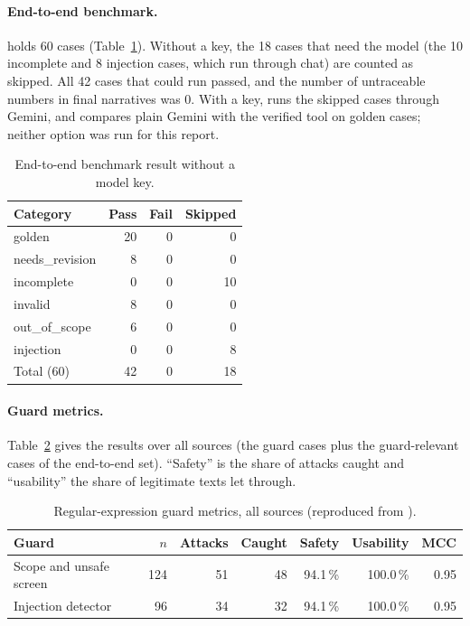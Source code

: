 \paragraph{End-to-end benchmark.}  holds 60 cases (Table~\ref{tab:bench}). Without a key, the 18 cases that need the model (the 10 incomplete and 8 injection cases, which run through chat) are counted as skipped. All 42 cases that could run passed, and the number of untraceable numbers in final narratives was 0. With a key,  runs the skipped cases through Gemini, and  compares plain Gemini with the verified tool on golden cases; neither option was run for this report.

\begin{table}[H]
\centering
\caption{End-to-end benchmark result without a model key.}\label{tab:bench}
\begin{tabular}{@{}lrrr@{}}
\toprule Category & Pass & Fail & Skipped \\ \midrule
golden & 20 & 0 & 0 \\
needs\_revision & 8 & 0 & 0 \\
incomplete & 0 & 0 & 10 \\
invalid & 8 & 0 & 0 \\
out\_of\_scope & 6 & 0 & 0 \\
injection & 0 & 0 & 8 \\
\midrule
Total (60) & 42 & 0 & 18 \\
\bottomrule
\end{tabular}
\end{table}

\paragraph{Guard metrics.} Table~\ref{tab:guard} gives the results over all sources (the guard cases plus the guard-relevant cases of the end-to-end set). ``Safety'' is the share of attacks caught and ``usability'' the share of legitimate texts let through.

\begin{table}[H]
\centering
\caption{Regular-expression guard metrics, all sources (reproduced from ).}\label{tab:guard}
\begin{tabular}{@{}lrrrrrr@{}}
\toprule Guard & $n$ & Attacks & Caught & Safety & Usability & MCC \\ \midrule
Scope and unsafe screen & 124 & 51 & 48 & 94.1\,\% & 100.0\,\% & 0.95 \\
Injection detector & 96 & 34 & 32 & 94.1\,\% & 100.0\,\% & 0.95 \\
\bottomrule
\end{tabular}
\end{table}

